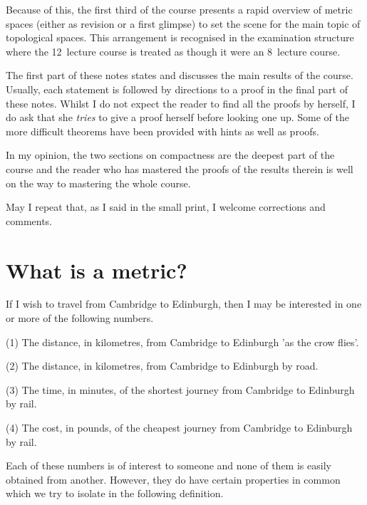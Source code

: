 Because of this, the first third of the course presents a rapid overview of metric spaces (either as revision or a first glimpse) to set the scene for the main topic of topological spaces. This arrangement is recognised in the examination structure where the 12~lecture course is treated as though it were an 8~lecture course.

The first part of these notes states and discusses the main results of the course. Usually, each statement is followed by directions to a proof in the final part of these notes. Whilst I do not expect the reader to find all the proofs by herself, I do ask that she \emph{tries} to give a proof herself before looking one up. Some of the more difficult theorems have been provided with hints as well as proofs.

In my opinion, the two sections on compactness are the deepest part of the course and the reader who has mastered the proofs of the results therein is well on the way to mastering the whole course.

May I repeat that, as I said in the small print, I welcome corrections and comments. \section{What is a metric?} If I wish to travel from Cambridge to Edinburgh, then I may be interested in one or more of the following numbers.

(1) The distance, in kilometres, from Cambridge to Edinburgh 'as the crow flies'.

(2) The distance, in kilometres, from Cambridge to Edinburgh by road.

(3) The time, in minutes, of the shortest journey from Cambridge to Edinburgh by rail.

(4) The cost, in pounds, of the cheapest journey from Cambridge to Edinburgh by rail.

Each of these numbers is of interest to someone and none of them is easily obtained from another. However, they do have certain properties in common which we try to isolate in the following definition. 

